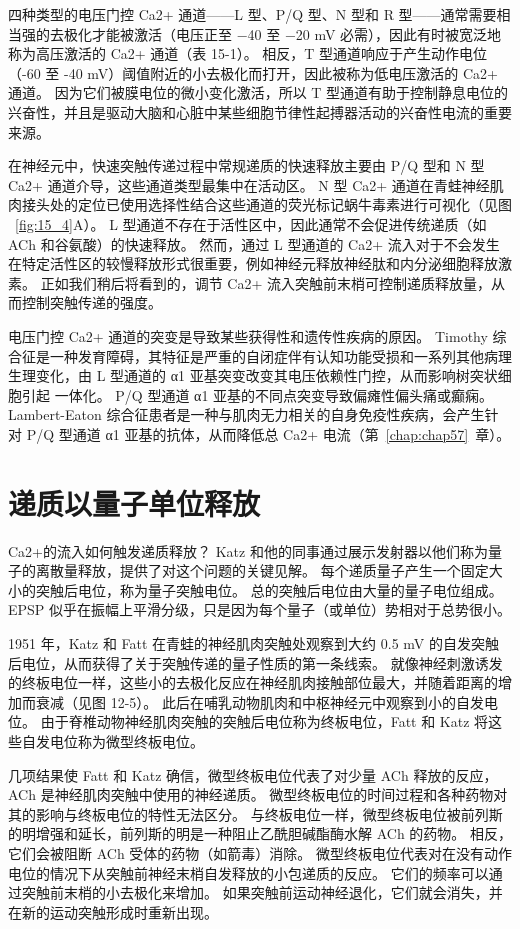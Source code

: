 四种类型的电压门控 Ca2+ 通道——L 型、P/Q 型、N 型和 R 型——通常需要相当强的去极化才能被激活（电压正至 −40 至 −20 mV 必需），因此有时被宽泛地称为高压激活的 Ca2+ 通道（表 15-1）。
相反，T 型通道响应于产生动作电位（-60 至 -40 mV）阈值附近的小去极化而打开，因此被称为低电压激活的 Ca2+ 通道。
因为它们被膜电位的微小变化激活，所以 T 型通道有助于控制静息电位的兴奋性，并且是驱动大脑和心脏中某些细胞节律性起搏器活动的兴奋性电流的重要来源。


在神经元中，快速突触传递过程中常规递质的快速释放主要由 P/Q 型和 N 型 Ca2+ 通道介导，这些通道类型最集中在活动区。
N 型 Ca2+ 通道在青蛙神经肌肉接头处的定位已使用选择性结合这些通道的荧光标记蜗牛毒素进行可视化（见图 ~\ref{fig:15_4}A）。
L 型通道不存在于活性区中，因此通常不会促进传统递质（如 ACh 和谷氨酸）的快速释放。
然而，通过 L 型通道的 Ca2+ 流入对于不会发生在特定活性区的较慢释放形式很重要，例如神经元释放神经肽和内分泌细胞释放激素。
正如我们稍后将看到的，调节 Ca2+ 流入突触前末梢可控制递质释放量，从而控制突触传递的强度。


电压门控 Ca2+ 通道的突变是导致某些获得性和遗传性疾病的原因。
Timothy 综合征是一种发育障碍，其特征是严重的自闭症伴有认知功能受损和一系列其他病理生理变化，由 L 型通道的 α1 亚基突变改变其电压依赖性门控，从而影响树突状细胞引起 一体化。
P/Q 型通道 α1 亚基的不同点突变导致偏瘫性偏头痛或癫痫。
Lambert-Eaton 综合征患者是一种与肌肉无力相关的自身免疫性疾病，会产生针对 P/Q 型通道 α1 亚基的抗体，从而降低总 Ca2+ 电流（第~\ref{chap:chap57}~章）。



\section{递质以量子单位释放}

Ca2+的流入如何触发递质释放？
Katz 和他的同事通过展示发射器以他们称为量子的离散量释放，提供了对这个问题的关键见解。
每个递质量子产生一个固定大小的突触后电位，称为量子突触电位。
总的突触后电位由大量的量子电位组成。
EPSP 似乎在振幅上平滑分级，只是因为每个量子（或单位）势相对于总势很小。


1951 年，Katz 和 Fatt 在青蛙的神经肌肉突触处观察到大约 0.5 mV 的自发突触后电位，从而获得了关于突触传递的量子性质的第一条线索。
就像神经刺激诱发的终板电位一样，这些小的去极化反应在神经肌肉接触部位最大，并随着距离的增加而衰减（见图 12-5）。
此后在哺乳动物肌肉和中枢神经元中观察到小的自发电位。
由于脊椎动物神经肌肉突触的突触后电位称为终板电位，Fatt 和 Katz 将这些自发电位称为微型终板电位。


几项结果使 Fatt 和 Katz 确信，微型终板电位代表了对少量 ACh 释放的反应，ACh 是神经肌肉突触中使用的神经递质。
微型终板电位的时间过程和各种药物对其的影响与终板电位的特性无法区分。
与终板电位一样，微型终板电位被前列斯的明增强和延长，前列斯的明是一种阻止乙酰胆碱酯酶水解 ACh 的药物。
相反，它们会被阻断 ACh 受体的药物（如箭毒）消除。 
微型终板电位代表对在没有动作电位的情况下从突触前神经末梢自发释放的小包递质的反应。
它们的频率可以通过突触前末梢的小去极化来增加。
如果突触前运动神经退化，它们就会消失，并在新的运动突触形成时重新出现。


